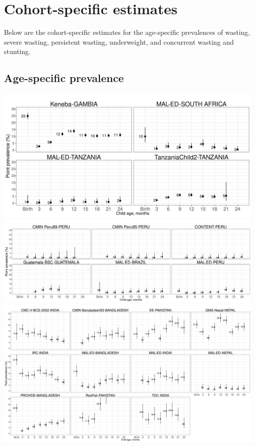 \documentclass[
  9pt,
]{book}
\begin{document}
\hypertarget{cohort}{%
\chapter{Cohort-specific estimates}\label{cohort}}

\raggedright

Below are the cohort-specific estimates for the age-specific prevalences of wasting, severe wasting, persistent wasting, underweight, and concurrent wasting and stunting.

\hypertarget{age-specific-prevalence-1}{%
\section{Age-specific prevalence}\label{age-specific-prevalence-1}}

\includegraphics[width=41.67in]{figures//wasting/fig-prev_plot_africa}
\includegraphics[width=62.5in]{figures//wasting/fig-prev_plot_lam}
\includegraphics[width=75in]{figures//wasting/fig-prev_plot_sasia}
\end{document}
